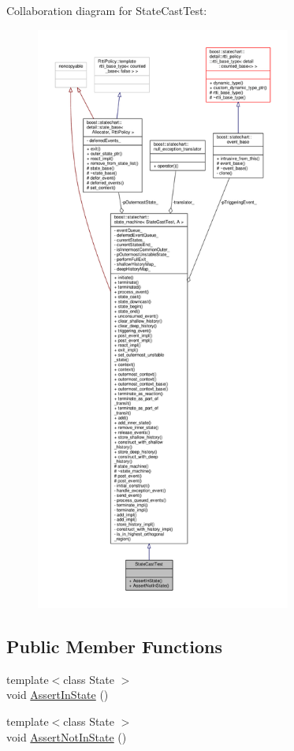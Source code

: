Collaboration diagram for State\+Cast\+Test\+:
\nopagebreak
\begin{figure}[H]
\begin{center}
\leavevmode
\includegraphics[height=550pt]{struct_state_cast_test__coll__graph}
\end{center}
\end{figure}
\subsection*{Public Member Functions}
\begin{DoxyCompactItemize}
\item 
{\footnotesize template$<$class State $>$ }\\void \mbox{\hyperlink{struct_state_cast_test_a0ca69a96b446253bafc300eb491faef8}{Assert\+In\+State}} ()
\item 
{\footnotesize template$<$class State $>$ }\\void \mbox{\hyperlink{struct_state_cast_test_a38608dc3d0e46414340f6333a0d16f5e}{Assert\+Not\+In\+State}} ()
\end{DoxyCompactItemize}
